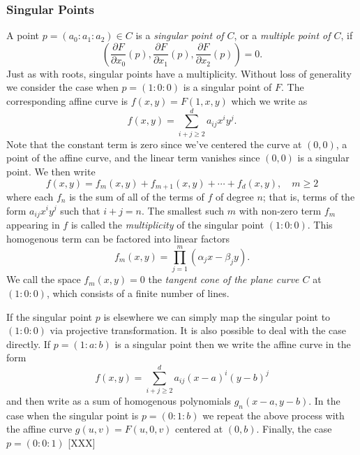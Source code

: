 \subsubsection*{Singular Points}

A point $p = (a_0 : a_1 : a_2) \in C$ is a {\it singular point of $C$},
or a {\it multiple point of $C$}, if
\[
  \left(
    \frac{\partial F}{\partial x_0} (p),
    \frac{\partial F}{\partial x_1} (p),
    \frac{\partial F}{\partial x_2} (p)
  \right)
  = 0.
\]
Just as with roots, singular points have a multiplicity. Without loss of
generality we consider the case when $p = (1 : 0 : 0)$ is a singular
point of $F$. The corresponding affine curve is $f(x,y) = F(1,x,y)$
which we write as
\[
  f(x,y) = \sum_{i+j \geq 2}^d a_{ij} x^iy^j.
\]
Note that the constant term is zero since we've centered the curve at
$(0, 0)$, a point of the affine curve, and the linear term vanishes
since $(0,0)$ is a singular point. We then write
\[
  f(x,y) = f_m(x,y) + f_{m+1}(x,y) + \cdots + f_d(x,y), \quad m \geq 2
\]
where each $f_n$ is the sum of all of the terms of $f$ of degree $n$;
that is, terms of the form $a_{ij}x^iy^j$ such that $i+j=n$. The
smallest such $m$ with non-zero term $f_m$ appearing in $f$ is called
the {\it multiplicity} of the singular point $(1 : 0 : 0)$. This
homogenous term can be factored into linear factors
\[
  f_m(x,y) = \prod_{j=1}^m (\alpha_jx - \beta_jy).
\]
We call the space $f_m(x,y) = 0$ the {\it tangent cone of the plane
  curve $C$} at $(1 : 0 : 0)$, which consists of a finite number of
lines.

If the singular point $p$ is elsewhere we can simply map the singular
point to $(1 : 0 : 0)$ via projective transformation. It is also
possible to deal with the case directly. If $p = (1 : a : b)$ is a
singular point then we write the affine curve in the form
\[
    f(x,y) = \sum_{i+j \geq 2}^d a_{ij} (x-a)^i(y-b)^j
\]
and then write as a sum of homogenous polynomials $g_n(x-a,y-b)$. In the
case when the singular point is $p = (0 : 1 : b)$ we repeat the above
process with the affine curve $g(u,v) = F(u,0,v)$ centered at
$(0,b)$. Finally, the case $p = (0 : 0 : 1)$ [XXX]

